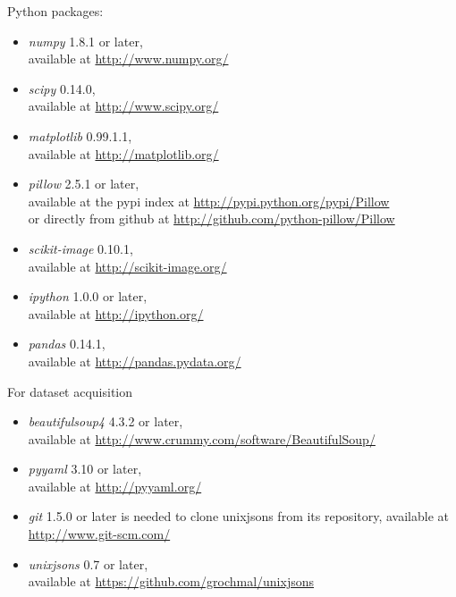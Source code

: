 \documentclass[11pt,a4paper,draft]{report}
\begin{document}
Python packages:
\begin{itemize}
\item[]\emph{numpy} 1.8.1 or later, \\
available at \href{http://www.numpy.org/}{http://www.numpy.org/}

\item[]\emph{scipy} 0.14.0, \\
available at \href{http://www.scipy.org/}{http://www.scipy.org/}

\item[]\emph{matplotlib} 0.99.1.1, \\
available at \href{http://matplotlib.org/}{http://matplotlib.org/}

\item[]\emph{pillow} 2.5.1 or later, \\
available at the pypi index at
\href{https://pypi.python.org/pypi/Pillow}
{http://pypi.python.org/pypi/Pillow} \\
or directly from github at
\href{http://github.com/python-pillow/Pillow}
{http://github.com/python-pillow/Pillow}

\item[]\emph{scikit-image} 0.10.1, \\
available at \href{http://scikit-image.org/}{http://scikit-image.org/}

\item[]\emph{ipython} 1.0.0 or later, \\
available at \href{http://ipython.org/}{http://ipython.org/}

\item[]\emph{pandas} 0.14.1, \\
available at \href{http://pandas.pydata.org/}{http://pandas.pydata.org/}
\end{itemize}

For dataset acquisition
\begin{itemize}
\item[]\emph{beautifulsoup4} 4.3.2 or later, \\
available at \href{http://www.crummy.com/software/BeautifulSoup/}
{http://www.crummy.com/software/BeautifulSoup/}

\item[]\emph{pyyaml} 3.10 or later, \\
available at \href{http://pyyaml.org/}{http://pyyaml.org/}

\item[]\emph{git} 1.5.0 or later is needed to clone unixjsons from its
repository, available at \href{http://www.git-scm.com/}{http://www.git-scm.com/}

\item[]\emph{unixjsons} 0.7 or later, \\
available at \href{https://github.com/grochmal/unixjsons}
{https://github.com/grochmal/unixjsons}
\end{itemize}
\end{document}
